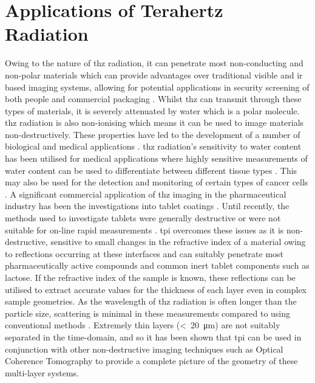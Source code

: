 \section{Applications of Terahertz Radiation}
Owing to the nature of \acrshort{thz} radiation, it can penetrate most non\nobreakdash-conducting and non\nobreakdash-polar materials which can provide advantages over traditional visible and \acrshort{ir} based imaging systems, allowing for potential applications in security screening of both people \DIFdelbegin \DIFdel{~}\DIFdelend \cite{Appleby2007} and commercial packaging \DIFdelbegin \DIFdel{~}\DIFdelend \cite{Federici2005}.
Whilst \acrshort{thz} can transmit through these types of materials, it is severely attenuated by water which is a polar molecule. \acrshort{thz} radiation is also non\nobreakdash-ionising which means it can be used to image materials non\nobreakdash-destructively. These properties have led to the development of a number of biological and medical applications \DIFdelbegin \DIFdel{~}\DIFdelend \cite{Wu2019, Goretti2022, Chen2021, Osman2020, Ruan2019}.
\acrshort{thz} radiation's sensitivity to water content has been utilised for medical applications where highly sensitive measurements of water content can be used to differentiate between different tissue types \DIFdelbegin \DIFdel{~}\DIFdelend \cite{Bennett2011}. This may also be used for the detection and monitoring of certain types of cancer cells \DIFdelbegin \DIFdel{~}\DIFdelend \cite{Yu2012}. 
A significant commercial application of \acrshort{thz} imaging in the pharmaceutical industry has been the investigations into tablet coatings \DIFdelbegin \DIFdel{~}\DIFdelend \cite{Ho2008}. Until recently, the methods used to investigate tablets were generally destructive or were not suitable for on\nobreakdash-line rapid measurements \DIFdelbegin \DIFdel{~}\DIFdelend \cite{Mowery2002}. \acrfull{tpi} overcomes these issues as it is non\nobreakdash-destructive, sensitive to small changes in the refractive index of a material owing to reflections occurring at these interfaces and can suitably penetrate most pharmaceutically active compounds and common inert tablet components such as lactose. If the refractive index of the sample is known, these reflections can be utilised to extract accurate values for the thickness of each layer even in complex sample geometries. As the wavelength of \acrshort{thz} radiation is often longer than the particle size, scattering is minimal in these measurements compared to using conventional methods \DIFdelbegin \DIFdel{~}\DIFdelend \cite{Korasa2018}. Extremely thin layers (<~\SI{20}{\micro\metre}) are not suitably separated in the time\nobreakdash-domain, and so it has been shown that \acrshort{tpi} can be used in conjunction with other non-destructive imaging techniques such as Optical Coherence Tomography \DIFdelbegin \DIFdel{~}\DIFdelend \cite{Lin2017} to provide a complete picture of the geometry of these multi-layer systems. 

